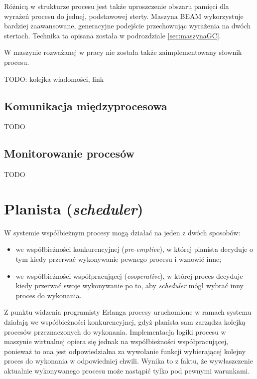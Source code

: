 Różnicą w strukturze procesu jest także uproszczenie obszaru pamięci dla wyrażeń procesu do jednej, podstawowej sterty. 
Maszyna BEAM wykorzystuje bardziej zaawansowane, generacyjne podejście przechowując wyrażenia na dwóch stertach.
Technika ta opisana została w podrozdziale \ref{sec:maszynaGC}.

W maszynie rozważanej w pracy nie została także zaimplementowany słownik procesu.

TODO: kolejka wiadomości, link

\subsection{Komunikacja międzyprocesowa}
\label{sub:procKolejka}

TODO

\subsection{Monitorowanie procesów}
\label{sub:procMonitory}

TODO

\section{Planista (\emph{scheduler})}
\label{sec:maszynaScheduler}

W systemie współbieżnym procesy mogą działać na jeden z dwóch sposobów:
\begin{itemize}
\item we współbieżności konkurencyjnej (\emph{pre-emptive}), w której planista decyduje o tym kiedy przerwać wykonywanie pewnego procesu i wznowić inne;
\item we współbieżności współpracującej (\emph{cooperative}), w której proces decyduje kiedy przerwać swoje wykonywanie po to, aby \emph{scheduler} mógł wybrać inny proces do wykonania.
\end{itemize}

Z punktu widzenia programisty Erlanga procesy uruchomione w ramach systemu działają we współbieżności konkurencyjnej, gdyż planista sam zarządza kolejką procesów przeznaczonych do wykonania.
Implementacja logiki procesu w maszynie wirtualnej opiera się jednak na współbieżności współpracującej, ponieważ to ona jest odpowiedzialna za wywołanie funkcji wybierającej kolejny proces do wykonania w odpowiedniej chwili. Wynika to z faktu, że wywłaszczenie aktualnie wykonywanego procesu może nastąpić tylko pod pewnymi warunkami.

